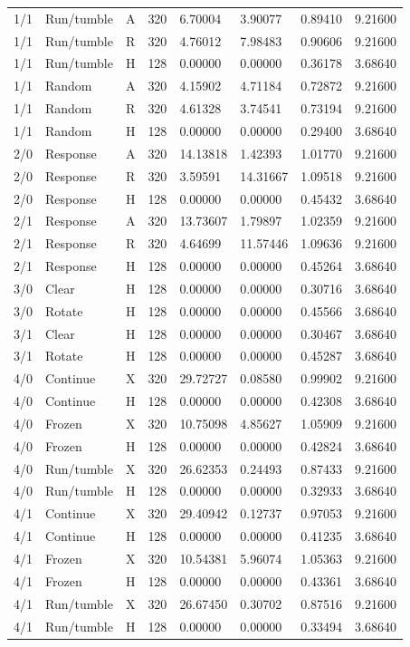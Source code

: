 \begin{longtable}{llllllll}
1/1 & Run/tumble & A & 320 & 6.70004 & 3.90077 & 0.89410 & 9.21600 \\
1/1 & Run/tumble & R & 320 & 4.76012 & 7.98483 & 0.90606 & 9.21600 \\
1/1 & Run/tumble & H & 128 & 0.00000 & 0.00000 & 0.36178 & 3.68640 \\
1/1 & Random & A & 320 & 4.15902 & 4.71184 & 0.72872 & 9.21600 \\
1/1 & Random & R & 320 & 4.61328 & 3.74541 & 0.73194 & 9.21600 \\
1/1 & Random & H & 128 & 0.00000 & 0.00000 & 0.29400 & 3.68640 \\
2/0 & Response & A & 320 & 14.13818 & 1.42393 & 1.01770 & 9.21600 \\
2/0 & Response & R & 320 & 3.59591 & 14.31667 & 1.09518 & 9.21600 \\
2/0 & Response & H & 128 & 0.00000 & 0.00000 & 0.45432 & 3.68640 \\
2/1 & Response & A & 320 & 13.73607 & 1.79897 & 1.02359 & 9.21600 \\
2/1 & Response & R & 320 & 4.64699 & 11.57446 & 1.09636 & 9.21600 \\
2/1 & Response & H & 128 & 0.00000 & 0.00000 & 0.45264 & 3.68640 \\
3/0 & Clear & H & 128 & 0.00000 & 0.00000 & 0.30716 & 3.68640 \\
3/0 & Rotate & H & 128 & 0.00000 & 0.00000 & 0.45566 & 3.68640 \\
3/1 & Clear & H & 128 & 0.00000 & 0.00000 & 0.30467 & 3.68640 \\
3/1 & Rotate & H & 128 & 0.00000 & 0.00000 & 0.45287 & 3.68640 \\
4/0 & Continue & X & 320 & 29.72727 & 0.08580 & 0.99902 & 9.21600 \\
4/0 & Continue & H & 128 & 0.00000 & 0.00000 & 0.42308 & 3.68640 \\
4/0 & Frozen & X & 320 & 10.75098 & 4.85627 & 1.05909 & 9.21600 \\
4/0 & Frozen & H & 128 & 0.00000 & 0.00000 & 0.42824 & 3.68640 \\
4/0 & Run/tumble & X & 320 & 26.62353 & 0.24493 & 0.87433 & 9.21600 \\
4/0 & Run/tumble & H & 128 & 0.00000 & 0.00000 & 0.32933 & 3.68640 \\
4/1 & Continue & X & 320 & 29.40942 & 0.12737 & 0.97053 & 9.21600 \\
4/1 & Continue & H & 128 & 0.00000 & 0.00000 & 0.41235 & 3.68640 \\
4/1 & Frozen & X & 320 & 10.54381 & 5.96074 & 1.05363 & 9.21600 \\
4/1 & Frozen & H & 128 & 0.00000 & 0.00000 & 0.43361 & 3.68640 \\
4/1 & Run/tumble & X & 320 & 26.67450 & 0.30702 & 0.87516 & 9.21600 \\
4/1 & Run/tumble & H & 128 & 0.00000 & 0.00000 & 0.33494 & 3.68640 \\
\bottomrule
\end{longtable}
